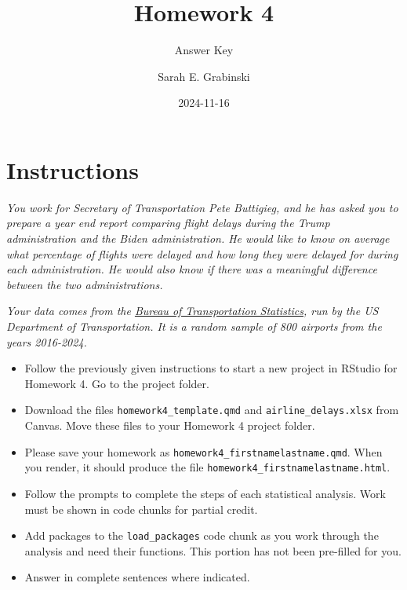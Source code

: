 \documentclass[
  letterpaper,
  DIV=11,
  numbers=noendperiod]{scrartcl}
\title{Homework 4}
\subtitle{Answer Key}
\author{Sarah E. Grabinski}
\date{2024-11-16}
\renewcommand*\contentsname{Table of contents}
\newcommand\contentsname{Table of contents}
\begin{document}
\maketitle

\renewcommand*\contentsname{Table of contents}
{
\hypersetup{linkcolor=}
\setcounter{tocdepth}{3}
\tableofcontents
}

\section*{Instructions}\label{instructions}

\emph{You work for Secretary of Transportation Pete Buttigieg, and he
has asked you to prepare a year end report comparing flight delays
during the Trump administration and the Biden administration. He would
like to know on average what percentage of flights were delayed and how
long they were delayed for during each administration. He would also
know if there was a meaningful difference between the two
administrations.}

\emph{Your data comes from the
\href{https://www.transtats.bts.gov/OT_Delay/OT_DelayCause1.asp?20=E}{Bureau
of Transportation Statistics}, run by the US Department of
Transportation. It is a random sample of 800 airports from the years
2016-2024.}

\begin{itemize}
\item
  Follow the previously given instructions to start a new project in
  RStudio for Homework 4. Go to the project folder.
\item
  Download the files \texttt{homework4\_template.qmd} and
  \texttt{airline\_delays.xlsx} from Canvas. Move these files to your
  Homework 4 project folder.
\item
  Please save your homework as
  \texttt{homework4\_firstnamelastname.qmd}. When you render, it should
  produce the file \texttt{homework4\_firstnamelastname.html}.
\item
  Follow the prompts to complete the steps of each statistical analysis.
  Work must be shown in code chunks for partial credit.
\item
  Add packages to the \texttt{load\_packages} code chunk as you work
  through the analysis and need their functions. This portion has not
  been pre-filled for you.
\item
  Answer in complete sentences where indicated.
\end{itemize}
\end{document}
